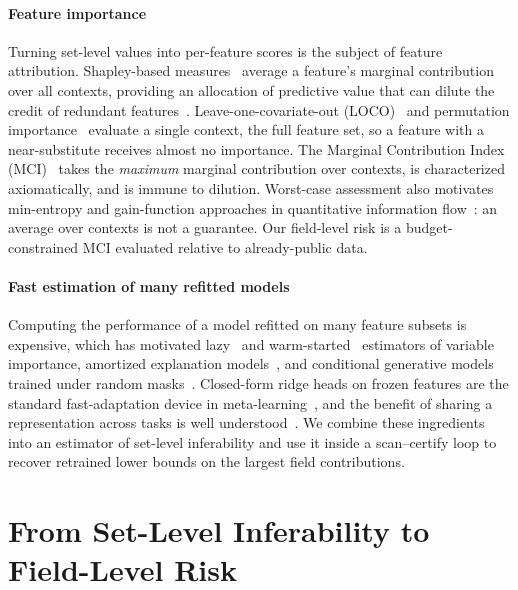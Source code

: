 \paragraph{Feature importance}
Turning set-level values into per-feature scores is the subject of feature attribution.
Shapley-based measures~\cite{shapley1953value,lundberg2017shap,covert2020sage,williamson2020spvim}
average a feature's marginal contribution over all contexts, providing an allocation of predictive value that can dilute the credit of redundant features~\cite{kumar2020shapley,catav2021mci}.
Leave-one-covariate-out (LOCO)~\cite{lei2018loco} and permutation importance~\cite{breiman2001rf,fisher2019mcr,hooker2021unrestricted}
evaluate a single context, the full feature set, so a feature with a near-substitute receives
almost no importance. The Marginal Contribution Index (MCI)~\cite{catav2021mci} takes the
\emph{maximum} marginal contribution over contexts, is characterized axiomatically, and is
immune to dilution. Worst-case assessment also motivates min-entropy and gain-function approaches in quantitative information flow~\cite{smith2009qif,alvim2012gleakage}: an average over contexts is not a guarantee.
Our field-level risk is a budget-constrained MCI evaluated relative to already-public data.

\paragraph{Fast estimation of many refitted models}
Computing the performance of a model refitted on many feature subsets is expensive, which has
motivated lazy~\cite{gao2022lazyvi} and warm-started~\cite{sun2025warmstart} estimators of
variable importance, amortized explanation models~\cite{jethani2022fastshap,covert2023vitshapley},
and conditional generative models trained under random masks~\cite{ivanov2019vaeac,li2020acflow,yoon2020vime,he2022mae}.
Closed-form ridge heads on frozen features are the standard fast-adaptation device in
meta-learning~\cite{bertinetto2019r2d2,lee2019metaoptnet}, and the benefit of sharing a
representation across tasks is well understood~\cite{caruana1997multitask,baxter2000inductive,maurer2016benefit}.
We combine these ingredients into an estimator of set-level inferability and use it inside a scan--certify loop to recover retrained lower bounds on the largest field contributions.

\section{From Set-Level Inferability to Field-Level Risk}\label{sec:problem}

